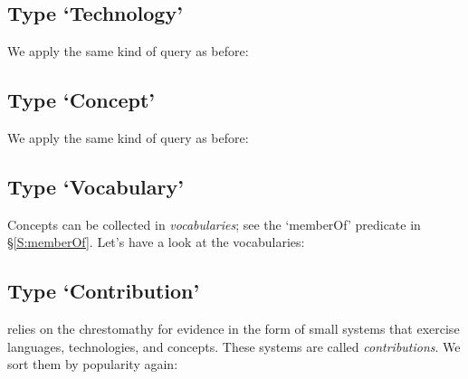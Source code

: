 \subsection{Type `Technology'}

We apply the same kind of query as before:




\subsection{Type `Concept'}

We apply the same kind of query as before:




\subsection{Type `Vocabulary'}

Concepts can be collected in \emph{vocabularies}; see the `memberOf'
predicate in \S\ref{S:memberOf}. Let's have a look at the vocabularies:






\subsection{Type `Contribution'}

\solasote{} relies on the chrestomathy \ooo{} for evidence in the form
of small systems that exercise languages, technologies, and
concepts. These systems are called \emph{contributions}. We sort them
by popularity again:


